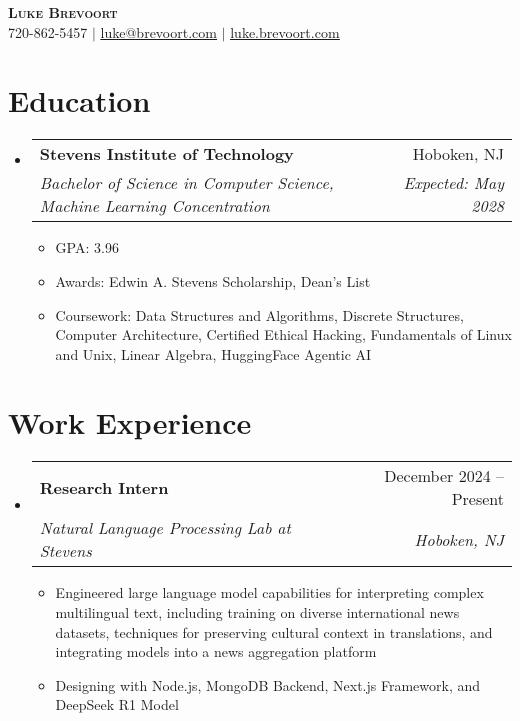 \documentclass[letterpaper,11pt]{article}
\makeatletter
\newcommand{\resumeItem}[1]{
  \item\small{
    {#1 \vspace{-2pt}}
  }
}
\newcommand{\resumeSubheading}[4]{
  \vspace{-2pt}\item
    \begin{tabular*}{0.97\textwidth}[t]{l@{\extracolsep{\fill}}r}
      \textbf{#1} & #2 \\
      \textit{\small#3} & \textit{\small #4} \\
    \end{tabular*}\vspace{-7pt}
}
\newcommand{\resumeSubHeadingListStart}{\begin{itemize}[leftmargin=0.15in, label={}]}
\newcommand{\resumeSubHeadingListEnd}{\end{itemize}}
\newcommand{\resumeItemListStart}{\begin{itemize}}
\newcommand{\resumeItemListEnd}{\end{itemize}\vspace{-5pt}}
\makeatother
\begin{document}
\begin{center}
    \textbf{\scshape Luke Brevoort} \\ \vspace{1pt}
    \small 720-862-5457 $|$ \href{mailto:luke@brevoort.com}{\underline{luke@brevoort.com}} $|$ 
    \href{https://luke.brevoort.com}{\underline{luke.brevoort.com}}
\end{center}

\section{Education}
  \resumeSubHeadingListStart
    \resumeSubheading
      {Stevens Institute of Technology}{Hoboken, NJ}
      {Bachelor of Science in Computer Science, Machine Learning Concentration}{Expected: May 2028}
      \resumeItemListStart
        \resumeItem{GPA: 3.96}
        \resumeItem{Awards: Edwin A. Stevens Scholarship, Dean's List}
        \resumeItem{Coursework: Data Structures and Algorithms, Discrete Structures, Computer Architecture, Certified Ethical Hacking, Fundamentals of Linux and Unix, Linear Algebra, HuggingFace Agentic AI}
      \resumeItemListEnd
  \resumeSubHeadingListEnd

\section{Work Experience}
  \resumeSubHeadingListStart

    \resumeSubheading
      {Research Intern}{December 2024 -- Present}
      {Natural Language Processing Lab at Stevens}{Hoboken, NJ}
      \resumeItemListStart
        \resumeItem{Engineered large language model capabilities for interpreting complex multilingual text, including training on diverse international news datasets, techniques for preserving cultural context in translations, and integrating models into a news aggregation platform}
        \resumeItem{Designing with Node.js, MongoDB Backend, Next.js Framework, and DeepSeek R1 Model}
      \resumeItemListEnd

  \resumeSubHeadingListEnd

\end{document}
